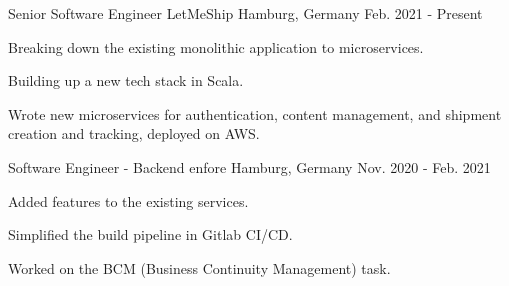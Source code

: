 

\begin{cventries}

  \cventry
    {Senior Software Engineer} %
    {LetMeShip} %
    {Hamburg, Germany} %
    {Feb. 2021 - Present} %
    {
      \begin{cvitems} %
        \item {Breaking down the existing monolithic application to microservices.}
        \item {Building up a new tech stack in Scala.}
        \item {Wrote new microservices for authentication, content management, and shipment creation and tracking, deployed on AWS.}
      \end{cvitems}
    }

  \cventry
    {Software Engineer - Backend} %
    {enfore} %
    {Hamburg, Germany} %
    {Nov. 2020 - Feb. 2021} %
    {
      \begin{cvitems} %
        \item {Added features to the existing services.}
        \item {Simplified the build pipeline in Gitlab CI/CD.}
        \item {Worked on the BCM (Business Continuity Management) task.}
      \end{cvitems}
    }


\end{cventries}
